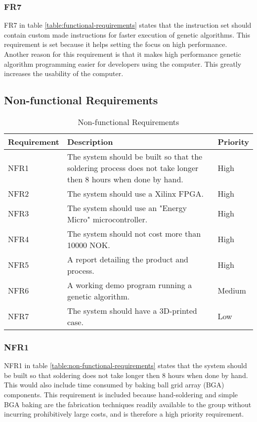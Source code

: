 \subsubsection{FR7}

FR7 in table \vref{table:functional-requirements} states that the instruction set should contain custom made instructions for faster execution of genetic algorithms.
This requirement is set because it helps setting the focus on high performance.
Another reason for this requirement is that it makes high performance genetic algorithm programming easier for developers using the computer.
This greatly increases the usability of the computer.

\subsection{Non-functional Requirements}

\begin{table}[H]
\begin{center}
\begin{tabular}{| l | p{7cm} | l |}
\hline
Requirement & Description & Priority \\
\hline
NFR1 & The system should be built so that the soldering process does not take longer then 8 hours when done by hand. & High \\
NFR2 & The system should use a Xilinx FPGA. & High\\
NFR3 & The system should use an "Energy Micro" microcontroller. & High \\
NFR4 & The system should not cost more than 10000 NOK. & High \\
NFR5 & A report detailing the product and process. & High \\
NFR6 & A working demo program running a genetic algorithm. & Medium \\
NFR7 & The system should have a 3D-printed case. & Low \\
\hline
\end{tabular}
\caption{Non-functional Requirements}
\label{table:non-functional-requirements}
\end{center}
\end{table}

\subsubsection{NFR1}

NFR1 in table \vref{table:non-functional-requirements} states that the system should be built so that soldering does not take longer then 8 hours when done by hand. This would also include time consumed by baking ball grid array (BGA) components.
This requirement is included because hand-soldering and simple BGA baking are the fabrication techniques readily available to the group without incurring prohibitively large costs, and is therefore a high priority requirement.

